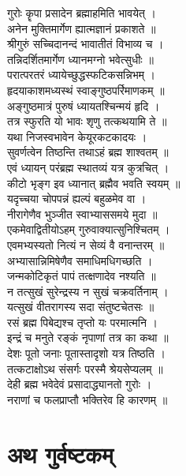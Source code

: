 गुरोः कॄपा प्रसादेन ब्रह्माहमिति भावयेत् ।\\[-2mm]
अनेन मुक्तिमार्गेण ह्यात्मज्ञानं प्रकाशते ॥\\
श्रीगुरुं सच्चिदानन्दं भावातीतं विभाव्य च ।\\[-2mm]
तन्निदर्शितमार्गेण ध्यानमग्नो भवेत्सुधीः ॥\\
परात्परतरं ध्यायेच्छुद्धस्फटिकसन्निभम् ।\\[-2mm]
हृदयाकाशमध्यस्थं स्वाङ्गुष्ठपर्रिमाणकम् ॥\\
अङ्गुष्ठमात्रं पुरुषं ध्यायतश्चिन्मयं हृदि ।\\[-2mm]
तत्र स्फुरति यो भावः शृणु तत्कथयामि ते ॥\\
यथा निजस्वभावेन केयूरकटकादयः ।\\[-2mm]
सुवर्णत्वेन तिष्ठन्ति तथाऽहं ब्रह्म शाश्वतम् ॥\\
एवं ध्यायन् परंब्रह्म स्थातव्यं यत्र कुत्रचित् ।\\[-2mm]
कीटो भृङ्ग इव ध्यानात् ब्रह्मैव भवति स्वयम् ॥\\
यदृच्चया चोपपन्नं ह्यल्पं बहुळमेव वा ।\\[-2mm]
नीरागेणैव भुञ्जीत स्वाभ्याससमये मुदा ॥\\
एकमेवाद्वितीयोऽहम् गुरुवाक्यात्सुनिश्चितम् ।\\[-2mm]
एवमभ्यस्यतो नित्यं न सेव्यं वै वनान्तरम् ॥\\
अभ्यासान्निमिषेणैव समाधिमधिगच्छति ।\\[-2mm]
जन्मकोटिकृतं पापं तत्क्षणादेव नश्यति ॥\\
न तत्सुखं सुरेन्द्रस्य न सुखं चक्रवर्तिनाम् ।\\[-2mm]
यत्सुखं वीतरागस्य सदा संतुष्टचेतसः ॥\\
रसं ब्रह्म पिबेद्यश्च तृप्तो यः परमात्मनि ।\\[-2mm]
इन्द्रं च मनुते रङ्कं नृपाणां तत्र का कथा ॥\\
देशः पूतो जनाः पूतास्तादृशो यत्र तिष्ठति ।\\[-2mm]
तत्कटाक्षोऽथ संसर्गः परस्मै श्रेयसेप्यलम्  ॥\\
देही ब्रह्म भवेदेवं प्रसादाद्ध्यानतो गुरोः ।\\[-2mm]
 नराणां च फलप्राप्तौ भक्तिरेव हि कारणम् ॥\\

\section{अथ गुर्वष्टकम्}

